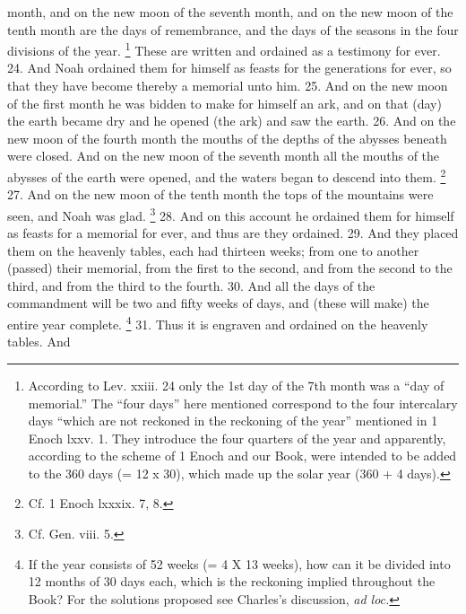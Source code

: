 month, and on the new moon of the seventh month, and on the new moon of the tenth month are the days of remembrance, and the days of the seasons in the four divisions of the year. \footnote{According to Lev. xxiii. 24 only the 1st day of the 7th month was a ``day of memorial.'' The ``four days'' here mentioned correspond to the four intercalary days ``which are not reckoned in the reckoning of the year'' mentioned in 1 Enoch lxxv. 1. They introduce the four quarters of the year and apparently, according to the scheme of 1 Enoch and our Book, were intended to be added to the 360 days (= 12 x 30), which made up the solar year (360 + 4 days).} These are written and ordained as a testimony for ever. 24. And Noah ordained them for himself as feasts for the generations for ever, so that they have become thereby a memorial unto him. 25. And on the new moon of the first month he was bidden to make for himself an ark, and on that (day) the earth became dry and he opened (the ark) and saw the earth. 26. And on the new moon of the fourth month the mouths of the depths of the abysses beneath were closed. And on the new moon of the seventh month all the mouths of the abysses of the earth were opened, and the waters began to descend into them. \footnote{Cf. 1 Enoch lxxxix. 7, 8.} 27. And on the new moon of the tenth month the tops of the mountains were seen, and Noah was glad. \footnote{Cf. Gen. viii. 5.} 28. And on this account he ordained them for himself as feasts for a memorial for ever, and thus are they ordained. 29. And they placed them on the heavenly tables, each had thirteen weeks; from one to another (passed) their memorial, from the first to the second, and from the second to the third, and from the third to the fourth. 30. And all the days of the commandment will be two and fifty weeks of days, and (these will make) the entire year complete. \footnote{If the year consists of 52 weeks (= 4 X 13 weeks), how can it be divided into 12 months of 30 days each, which is the reckoning implied throughout the Book? For the solutions proposed see Charles's discussion, \emph{ad loc.}} 31. Thus it is engraven and ordained on the heavenly tables. And

